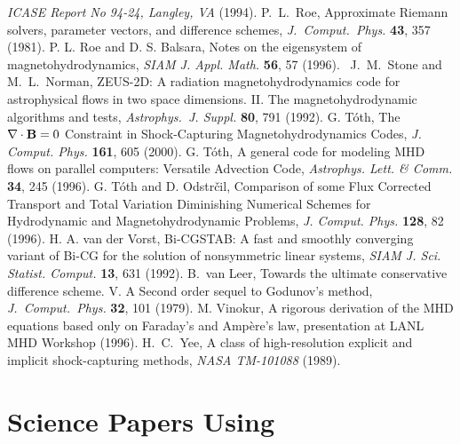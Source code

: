 \begin{thebibliography}{33}
    {\it ICASE Report No 94-24, Langley, VA} (1994).
    P.\ L.\ Roe,
    Approximate Riemann solvers, parameter vectors, 
    and difference schemes,
    {\it J.\ Comput.\ Phys.} {\bf 43}, 357 (1981).
    P. L. Roe and D. S. Balsara, 
    Notes on the eigensystem of magnetohydrodynamics,
    {\it SIAM J. Appl. Math.} {\bf 56}, 57 (1996).\
    J.\ M.\ Stone and M.\ L.\ Norman, 
    ZEUS-2D: A radiation magnetohydrodynamics code for 
    astrophysical flows in two space dimensions.
    II. The magnetohydrodynamic algorithms and tests,
    {\it Astrophys.\ J. Suppl.} {\bf 80}, 791 (1992).
    G. T\'oth,
    The $\nabla\cdot\mathbf{B}=0$ Constraint in Shock-Capturing Magnetohydrodynamics Codes,
    {\it J. Comput. Phys.} {\bf 161}, 605 (2000).
    G. T\'oth,
    A general code for modeling MHD flows on parallel computers:
    Versatile Advection Code,
    {\it Astrophys. Lett. \& Comm.} {\bf 34}, 245 (1996).
    G. T\'oth and D. Odstr\v cil,
    Comparison of some Flux Corrected Transport
    and Total Variation Diminishing Numerical Schemes
    for Hydrodynamic and Magnetohydrodynamic Problems,
    {\it J. Comput. Phys.} {\bf 128}, 82 (1996).
    H. A. van der Vorst,
    Bi-CGSTAB: A fast and smoothly converging variant of Bi-CG
    for the solution of nonsymmetric linear systems,
    {\it SIAM J. Sci. Statist. Comput.} {\bf 13}, 631 (1992).
    B.\ van Leer,
    Towards the ultimate conservative difference scheme. 
    V. A Second order sequel to Godunov's method,
    {\it J.\ Comput.\ Phys.} {\bf 32}, 101 (1979).
    M. Vinokur,
    A rigorous derivation of the MHD equations based only on 
    Faraday's and Amp\`ere's law,
    presentation at LANL MHD Workshop (1996).
    H.\ C.\ Yee,
    A class of high-resolution explicit and implicit shock-capturing methods,
    {\it NASA TM-101088} (1989).

\section*{Science Papers Using \BATSRUS}

\end{thebibliography}


